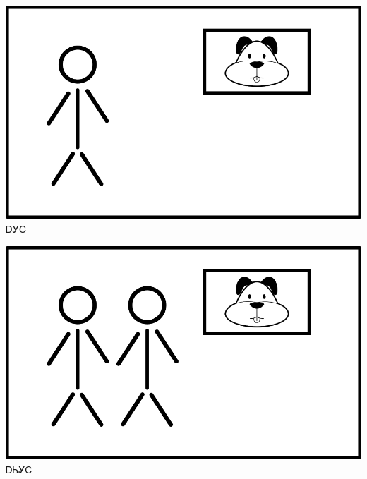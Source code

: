 \documentclass[avery8371]{flashcards}%
\begin{document}
    \begin{flashcard}{
        \includegraphics[width=0.95\columnwidth,height=.51\columnwidth,keepaspectratio]{../artwork/flags/agihli-flag}
    }
        \Huge ᎠᎩᏟ
    \end{flashcard}
    \begin{flashcard}{
        \includegraphics[width=0.95\columnwidth,height=.51\columnwidth,keepaspectratio]{../artwork/flags/anigihli-flag}
    }
        \Huge ᎠᏂᎩᏟ
    \end{flashcard}
\end{document}
